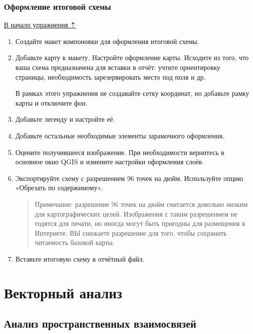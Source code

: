 \documentclass[
  12pt,
]{book}
\begin{document}
\hypertarget{map-ref-districts-result}{%
\section{Оформление итоговой схемы}\label{map-ref-districts-result}}

\protect\hyperlink{map-ref-districts}{В начало упражнения ⇡}

\begin{enumerate}
\def\labelenumi{\arabic{enumi}.}
\item
  Создайте макет компоновки для оформления итоговой схемы.
\item
  Добавьте карту к макету. Настройте оформление карты. Исходите из того, что ваша схема предназначена для вставки в отчёт: учтите ориентировку страницы, необходимость зарезервировать место под поля и др.

  В рамках этого упражнения не создавайте сетку координат, но добавьте рамку карты и отключите фон.
\item
  Добавьте легенду и настройте её.
\item
  Добавьте остальные необходимые элементы зарамочного оформления.
\item
  Оцените получившееся изображение. При необходимости вернитесь в основное окно QGIS и измените настройки оформления слоёв.
\item
  Экспортируйте схему с разрешением 96 точек на дюйм. Используйте опцию «Обрезать по содержимому».

  \begin{quote}
  Примечание: разрешение 96 точек на дюйм считается довольно низким для картографических целей. Изображения с таким разрешением не годятся для печати, но иногда могут быть пригодны для размещения в Интернете. ВЫ снижаете разрешение для того, чтобы сохранить читаемость базовой карты.
  \end{quote}
\item
  Вставьте итоговую схему в отчётный файл.
\end{enumerate}

\hypertarget{part-ux432ux435ux43aux442ux43eux440ux43dux44bux439-ux430ux43dux430ux43bux438ux437}{%
\part{Векторный анализ}\label{part-ux432ux435ux43aux442ux43eux440ux43dux44bux439-ux430ux43dux430ux43bux438ux437}}

\hypertarget{overlay}{%
\chapter{Анализ пространственных взаимосвязей}\label{overlay}}
\end{document}
